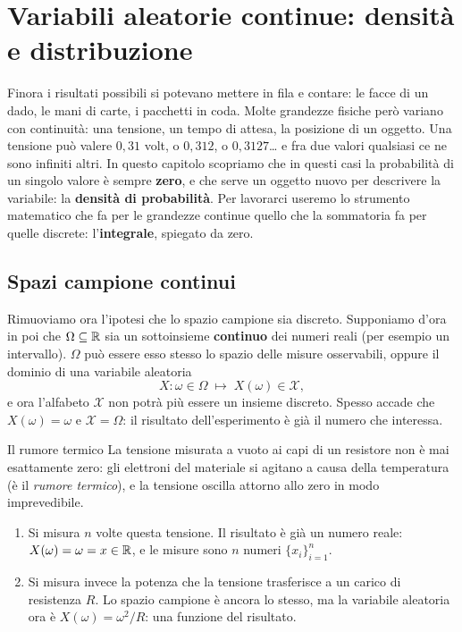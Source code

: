 \chapter{Variabili aleatorie continue: densità e distribuzione}

Finora i risultati possibili si potevano mettere in fila e contare: le facce di un dado, le mani di carte, i pacchetti
in coda. Molte grandezze fisiche però variano con continuità: una tensione, un tempo di attesa, la posizione di un
oggetto. Una tensione può valere $0{,}31$ volt, o $0{,}312$, o $0{,}3127$\ldots{} e fra due valori qualsiasi ce ne sono
infiniti altri. In questo capitolo scopriamo che in questi casi la probabilità di un singolo valore è sempre
\textbf{zero}, e che serve un oggetto nuovo per descrivere la variabile: la \textbf{densità di probabilità}. Per
lavorarci useremo lo strumento matematico che fa per le grandezze continue quello che la sommatoria fa per quelle
discrete: l'\textbf{integrale}, spiegato da zero.

\section{Spazi campione continui}

Rimuoviamo ora l'ipotesi che lo spazio campione sia discreto. Supponiamo d'ora in poi che $\Omega \subseteq \mathbb{R}$ sia un
sottoinsieme \textbf{continuo} dei numeri reali (per esempio un intervallo). $\Omega$ può essere esso stesso lo spazio
delle misure osservabili, oppure il dominio di una variabile aleatoria
\[ X : \omega \in \Omega \;\longmapsto\; X(\omega) \in \mathcal{X} , \]
e ora l'alfabeto $\mathcal{X}$ non potrà più essere un insieme discreto. Spesso accade che $X(\omega) = \omega$ e
$\mathcal{X} = \Omega$: il risultato dell'esperimento è già il numero che interessa.

\begin{esempio}{Il rumore termico}
La tensione misurata a vuoto ai capi di un resistore non è mai esattamente zero: gli elettroni del materiale si
agitano a causa della temperatura (è il \emph{rumore termico}), e la tensione oscilla attorno allo zero in modo
imprevedibile.
\begin{enumerate}[label=\alph*)]
  \item Si misura $n$ volte questa tensione. Il risultato è già un numero reale: $X(\omega) = \omega = x \in \mathbb{R}$, e le
        misure sono $n$ numeri $\{x_i\}_{i=1}^{n}$.
  \item Si misura invece la potenza che la tensione trasferisce a un carico di resistenza $R$. Lo spazio campione è
        ancora lo stesso, ma la variabile aleatoria ora è $X(\omega) = \omega^2/R$: una funzione del risultato.
\end{enumerate}
\end{esempio}

